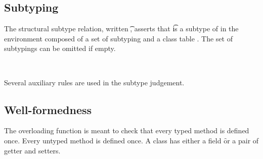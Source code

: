 \documentclass[a4paper,USenglish]{tex/lipics-v2016}
\begin{document}
\subsection{Subtyping}

The structural subtype relation, written \StrSub\M\K\t\tp, asserts that \t
is a subtype of \tp in the environment composed of a set of subtyping \M and
a class table \K.   The set of subtypings can be omitted if empty.

~\\

\begin{mathpar}


\end{mathpar}

Several auxiliary rules are used in the subtype judgement. 

\begin{mathpar}



\end{mathpar}

\subsection{Well-formedness}

The overloading function is meant to check that every typed method is
defined once. Every untyped method is defined once. A class has either a
field \f or a pair of getter and setters.


\begin{mathpar}
\end{mathpar}
\end{document}
